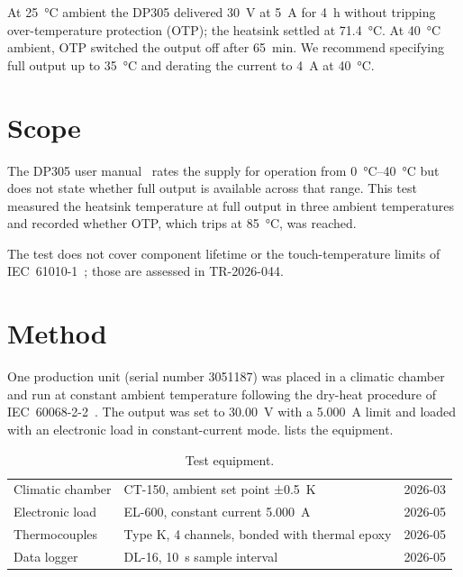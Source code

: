 \documentclass[type=report, lang=en-GB]{plaindoc}
\begin{document}
\maketitle

\begin{summary}
At \qty{25}{\degreeCelsius} ambient the DP305 delivered \qty{30}{\volt} at
\qty{5}{\ampere} for \qty{4}{\hour} without tripping over-temperature
protection (OTP); the heatsink settled at \qty{71.4}{\degreeCelsius}. At
\qty{40}{\degreeCelsius} ambient, OTP switched the output off after
\qty{65}{\minute}. We recommend specifying full output up to
\qty{35}{\degreeCelsius} and derating the current to \qty{4}{\ampere} at
\qty{40}{\degreeCelsius}.
\end{summary}

\section{Scope}

The DP305 user manual~\cite{dp305um} rates the supply for operation from
\qtyrange{0}{40}{\degreeCelsius} but does not state whether full output is
available across that range. This test measured the heatsink temperature at
full output in three ambient temperatures and recorded whether OTP, which
trips at \qty{85}{\degreeCelsius}, was reached.

The test does not cover component lifetime or the touch-temperature limits
of \mbox{IEC 61010-1}~\cite{iec61010}; those are assessed in TR-2026-044.

\section{Method}

One production unit (serial number 3051187) was placed in a climatic chamber
and run at constant ambient temperature following the dry-heat procedure of
\mbox{IEC 60068-2-2}~\cite{iec60068}. The output was set to \qty{30.00}{\volt} with a
\qty{5.000}{\ampere} limit and loaded with an electronic load in constant-current
mode.  lists the equipment.

\begin{table}
\caption{Test equipment.}
\label{tab:equipment}
\begin{tabularx}{\linewidth}{@{}lL l@{}}
\toprule
{} &  &  \\
\midrule
Climatic chamber   & CT-150, ambient set point ±\qty{0.5}{\kelvin}       & 2026-03 \\
Electronic load    & EL-600, constant current \qty{5.000}{\ampere}        & 2026-05 \\
Thermocouples      & Type K, \num{4} channels, bonded with thermal epoxy  & 2026-05 \\
Data logger        & DL-16, \qty{10}{\s} sample interval                  & 2026-05 \\
\bottomrule
\end{tabularx}
\end{table}
\end{document}
